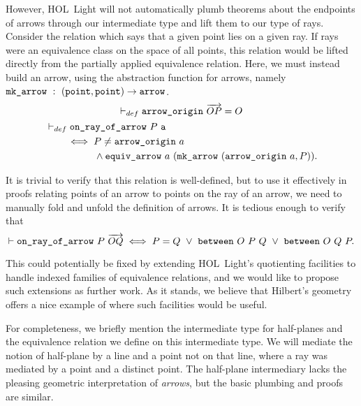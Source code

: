 However, HOL~Light will not automatically plumb theorems about the endpoints of arrows through our intermediate type and lift them to our type of rays. Consider the relation which says that a given point lies on a given ray. If rays were an equivalence class on the space of all points, this relation would be lifted directly from the partially applied equivalence relation. Here, we must instead build an arrow, using the abstraction function for arrows, namely $\code{mk\_arrow}\ :\ (\code{point},\code{point})\rightarrow\code{arrow}$.
\begin{gather}
  \vdash_{def}\code{arrow\_origin}\ \overrightarrow{OP} = O\\
  \begin{split}
    &\vdash_{def}\code{on\_ray\_of\_arrow}\ P\ \code{a}\\
    &\qquad\iff P \neq \code{arrow\_origin}\ a\\
    &\qquad\qquad\quad\wedge \code{equiv\_arrow}\ a\ (\code{mk\_arrow}\ (\code{arrow\_origin}\ a, P)).
  \end{split}
\end{gather}

It is trivial to verify that this relation is well-defined, but to use it effectively in proofs relating points of an arrow to points on the ray of an arrow, we need to manually fold and unfold the definition of arrows. It is tedious enough to verify that
\begin{equation}
  \vdash\code{on\_ray\_of\_arrow}\ P\ \overrightarrow{OQ} \iff P = Q\ \vee\ \between{O}{P}{Q}\ \vee\ \between{O}{Q}{P}.
\end{equation}

This could potentially be fixed by extending HOL~Light's quotienting facilities to handle indexed families of equivalence relations, and we would like to propose such extensions as further work. As it stands, we believe that Hilbert's geometry offers a nice example of where such facilities would be useful.

For completeness, we briefly mention the intermediate type for half-planes and the equivalence relation we define on this intermediate type. We will mediate the notion of half-plane by a line and a point not on that line, where a ray was mediated by a point and a distinct point. The half-plane intermediary lacks the pleasing geometric interpretation of \emph{arrows}, but the basic plumbing and proofs are similar. 

